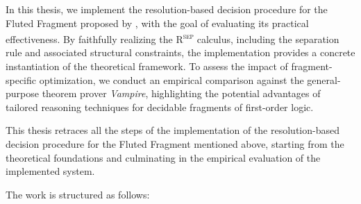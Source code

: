 
In this thesis, we implement the resolution-based decision procedure for the Fluted Fragment proposed by \citeauthor{schmidt2000resolution}, with the goal of evaluating its practical effectiveness.
By faithfully realizing the \textsc{R\textsuperscript{sep}} calculus, including the separation rule and associated structural constraints, the implementation provides a concrete instantiation of the theoretical framework.
To assess the impact of fragment-specific optimization, we conduct an empirical comparison against the general-purpose theorem prover \textit{Vampire}, highlighting the potential advantages of tailored reasoning techniques for decidable fragments of first-order logic.


This thesis retraces all the steps of the implementation of the resolution-based decision procedure for the Fluted Fragment mentioned above, starting from the theoretical foundations and culminating in the empirical evaluation of the implemented system.

The work is structured as follows:


